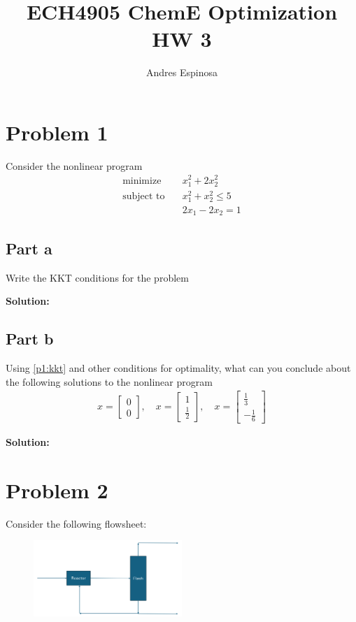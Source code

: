 \documentclass[11pt]{article}
\title{ECH4905 ChemE Optimization HW 3}
\author{Andres Espinosa}
\begin{document}
\maketitle

\section{Problem 1}
Consider the nonlinear program
\begin{align*}
  \text{minimize} & \quad x_1^2 + 2x_2^2 \\
  \text{subject to} & \quad x_1^2 + x_2^2 \leq 5 \\
  & \quad 2x_1 - 2x_2 = 1
\end{align*}

\subsection{Part a}
Write the KKT conditions for the problem
\label{p1:kkt}

\textbf{Solution: }

\subsection{Part b}
Using \ref{p1:kkt} and other conditions for optimality, what can you conclude about the following solutions to the nonlinear program
\begin{align*}
  x = 
  \begin{bmatrix}
    0 \\ 0
  \end{bmatrix}
  , \quad
  x = 
  \begin{bmatrix}
    1 \\ \frac{1}{2}
  \end{bmatrix}
  , \quad 
  x = 
  \begin{bmatrix}
    \frac{1}{3} \\ -\frac{1}{6}
  \end{bmatrix}
\end{align*}

\textbf{Solution: }

\section{Problem 2}
Consider the following flowsheet:

\begin{figure}[htbp]
  \centerline{\includegraphics[width=0.5\textwidth]{images/flowsheet.png}}
  \label{fig:flowsheet}
\end{figure}
\end{document}
